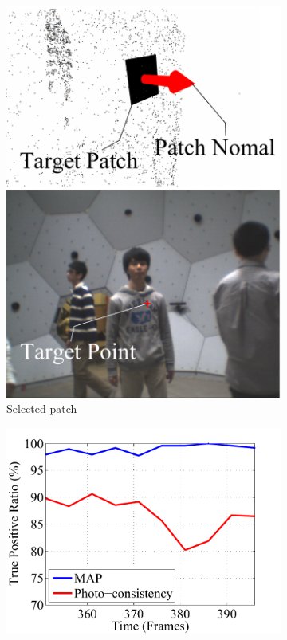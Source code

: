 \begin{figure}[t]
\begin{subfigure}{0.3\textwidth}
			\includegraphics[width=\textwidth]{figures/GT_input_final}
			\caption{Selected patch}
		\end{subfigure}
	\begin{subfigure}{0.4\textwidth}
		\includegraphics[width=\textwidth]{figures/VisibilityError2}

\end{subfigure}
\end{figure}
